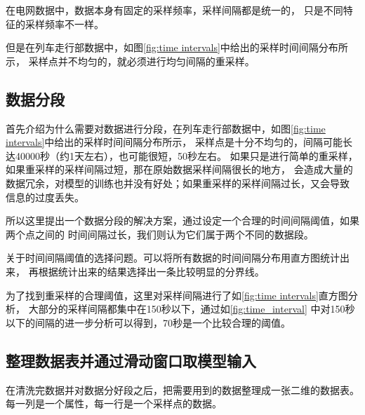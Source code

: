   在电网数据中，数据本身有固定的采样频率，采样间隔都是统一的，
  只是不同特征的采样频率不一样。

  但是在列车走行部数据中，如图\ref{fig:time intervals}中给出的采样时间间隔分布所示，
  采样点并不均匀的，就必须进行均匀间隔的重采样。

  \subsection{数据分段}
  首先介绍为什么需要对数据进行分段，在列车走行部数据中，如图\ref{fig:time intervals}中给出的采样时间间隔分布所示，
  采样点是十分不均匀的，间隔可能长达40000秒（约1天左右），也可能很短，50秒左右。
  如果只是进行简单的重采样，如果重采样的采样间隔过短，那在原始数据采样间隔很长的地方，
  会造成大量的数据冗余，对模型的训练也并没有好处；如果重采样的采样间隔过长，又会导致
  信息的过度丢失。

  所以这里提出一个数据分段的解决方案，通过设定一个合理的时间间隔阈值，如果两个点之间的
  时间间隔过长，我们则认为它们属于两个不同的数据段。

  关于时间间隔阈值的选择问题。可以将所有数据的时间间隔分布用直方图统计出来，
  再根据统计出来的结果选择出一条比较明显的分界线。

  为了找到重采样的合理阈值，这里对采样间隔进行了如\ref{fig:time intervals}直方图分析，
  大部分的采样间隔都集中在150秒以下，通过如\ref{fig:time_interval}
  中对150秒以下的间隔的进一步分析可以得到，70秒是一个比较合理的阈值。

  \subsection{整理数据表并通过滑动窗口取模型输入}
  在清洗完数据并对数据分好段之后，把需要用到的数据整理成一张二维的数据表。
  每一列是一个属性，每一行是一个采样点的数据。




